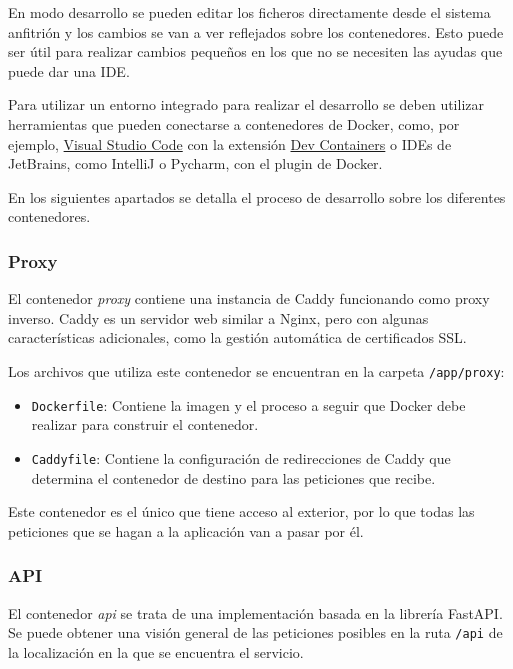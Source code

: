 En modo desarrollo se pueden editar los ficheros directamente desde el sistema
anfitrión y los cambios se van a ver reflejados sobre los contenedores. Esto
puede ser útil para realizar cambios pequeños en los que no se necesiten las
ayudas que puede dar una IDE.

Para utilizar un entorno integrado para realizar el desarrollo se deben utilizar
herramientas que pueden conectarse a contenedores de Docker, como, por ejemplo,
\href{https://code.visualstudio.com/}{Visual Studio Code} con la extensión
\href{https://marketplace.visualstudio.com/items?itemName=ms-vscode-remote.remote-containers}{Dev
Containers} o IDEs de JetBrains, como IntelliJ o Pycharm, con el plugin de
Docker.

En los siguientes apartados se detalla el proceso de desarrollo sobre los
diferentes contenedores.

\subsubsection{Proxy}

El contenedor \textit{proxy} contiene una instancia de Caddy funcionando como
proxy inverso. Caddy es un servidor web similar a Nginx, pero con algunas
características adicionales, como la gestión automática de certificados SSL.

Los archivos que utiliza este contenedor se encuentran en la carpeta
\texttt{/app/proxy}:

\begin{itemize}
    \item \texttt{Dockerfile}: Contiene la imagen y el proceso a seguir que
          Docker debe realizar para construir el contenedor.
    \item \texttt{Caddyfile}: Contiene la configuración de redirecciones de
          Caddy que determina el contenedor de destino para las peticiones que
          recibe.
\end{itemize}

Este contenedor es el único que tiene acceso al exterior, por lo que todas las
peticiones que se hagan a la aplicación van a pasar por él.

\subsubsection{API}

El contenedor \textit{api} se trata de una implementación basada en la librería
FastAPI. Se puede obtener una visión general de las peticiones posibles en la
ruta \texttt{/api} de la localización en la que se encuentra el servicio.

